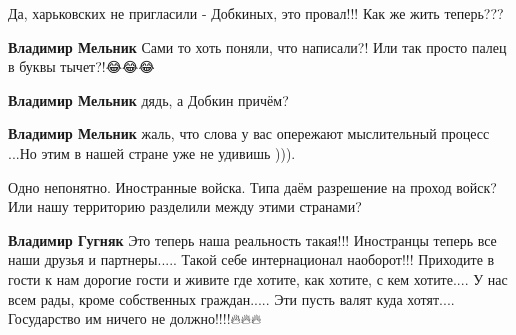 \begin{itemize}
Да, харьковских не пригласили - Добкиных, это провал!!! Как же жить теперь???

\begin{itemize}
 
\textbf{Владимир Мельник} Сами то хоть поняли, что написали?!
Или так просто палец в буквы тычет?!😂😂😂

 
\textbf{Владимир Мельник} дядь, а Добкин причём?

 
\textbf{Владимир Мельник} жаль, что слова у вас опережают мыслительный процесс ...Но этим в нашей стране уже не удивишь ))).
\end{itemize}

 
Одно непонятно. Иностранные войска. Типа даём разрешение на проход войск? Или
нашу территорию разделили между этими странами?

\begin{itemize}
 
\textbf{Владимир Гугняк} Это теперь наша реальность такая!!!
Иностранцы теперь все наши друзья и партнеры.....
Такой себе интернационал наоборот!!!
Приходите в гости к нам дорогие гости и живите где хотите, как хотите, с кем хотите....
У нас всем рады, кроме собственных граждан.....
Эти пусть валят куда хотят....
Государство им ничего не должно!!!!🔥🔥🔥


\end{itemize}
\end{itemize}
